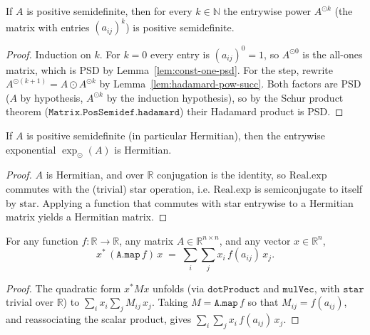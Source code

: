\begin{lemma}
    \label{lem:hadamard-pow-psd}
    \leanok
    If $A$ is positive semidefinite, then for every $k \in \mathbb{N}$ the
    entrywise power $A^{\odot k}$ (the matrix with entries $(a_{ij})^k$) is
    positive semidefinite.
\end{lemma}
\begin{proof}
    Induction on $k$. For $k = 0$ every entry is $(a_{ij})^0 = 1$, so
    $A^{\odot 0}$ is the all-ones matrix, which is PSD by
    Lemma~\ref{lem:const-one-psd}. For the step, rewrite
    $A^{\odot (k+1)} = A \odot A^{\odot k}$ by
    Lemma~\ref{lem:hadamard-pow-succ}. Both factors are PSD ($A$ by hypothesis,
    $A^{\odot k}$ by the induction hypothesis), so by the Schur product theorem
    ($\texttt{Matrix.PosSemidef.hadamard}$) their Hadamard product is PSD.
\end{proof}

\begin{lemma}
    \label{lem:exp-hermitian}
    \leanok
    If $A$ is positive semidefinite (in particular Hermitian), then the
    entrywise exponential $\exp_{\odot}(A)$ is Hermitian.
\end{lemma}
\begin{proof}
    $A$ is Hermitian, and over $\mathbb{R}$ conjugation is the identity, so
    $\mathrm{Real.exp}$ commutes with the (trivial) star operation, i.e.
    $\mathrm{Real.exp}$ is semiconjugate to itself by $\mathrm{star}$. Applying a
    function that commutes with star entrywise to a Hermitian matrix yields a
    Hermitian matrix.
\end{proof}

\begin{lemma}
    \label{lem:quadform-map-double-sum}
    \leanok
    For any function $f : \mathbb{R} \to \mathbb{R}$, any matrix
    $A \in \mathbb{R}^{n \times n}$, and any vector $x \in \mathbb{R}^n$,
    \[
        x^{*}\, (\texttt{A.map}\,f)\, x \;=\; \sum_{i}\sum_{j} x_i\, f(a_{ij})\, x_j .
    \]
\end{lemma}
\begin{proof}
    The quadratic form $x^{*} M x$ unfolds (via $\texttt{dotProduct}$ and
    $\texttt{mulVec}$, with $\texttt{star}$ trivial over $\mathbb{R}$) to
    $\sum_i x_i \sum_j M_{ij}\, x_j$. Taking $M = \texttt{A.map}\,f$ so that
    $M_{ij} = f(a_{ij})$, and reassociating the scalar product, gives
    $\sum_i \sum_j x_i\, f(a_{ij})\, x_j$.
\end{proof}

